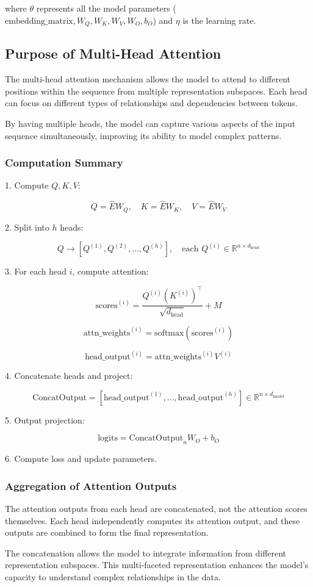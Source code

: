 \documentclass{article}
\begin{document}
where \( \theta \) represents all the model parameters (\( \text{embedding\_matrix}, W_Q, W_K, W_V, W_O, b_O \)) and \( \eta \) is the learning rate.

\subsection{Purpose of Multi-Head Attention}

The multi-head attention mechanism allows the model to attend to different positions within the sequence from multiple representation subspaces. Each head can focus on different types of relationships and dependencies between tokens.

By having multiple heads, the model can capture various aspects of the input sequence simultaneously, improving its ability to model complex patterns.

\subsubsection{Computation Summary}

1. Compute \( Q, K, V \):

   \[
   Q = \hat{E} W_Q, \quad K = \hat{E} W_K, \quad V = \hat{E} W_V
   \]

2. Split into \( h \) heads:

   \[
   Q \rightarrow [Q^{(1)}, Q^{(2)}, \dots, Q^{(h)}], \quad \text{each } Q^{(i)} \in \mathbb{R}^{n \times d_{\text{head}}}
   \]

3. For each head \( i \), compute attention:

   \[
   \text{scores}^{(i)} = \frac{Q^{(i)} (K^{(i)})^\top}{\sqrt{d_{\text{head}}}} + M
   \]
   
   \[
   \text{attn\_weights}^{(i)} = \text{softmax}(\text{scores}^{(i)})
   \]
   
   \[
   \text{head\_output}^{(i)} = \text{attn\_weights}^{(i)} V^{(i)}
   \]

4. Concatenate heads and project:

   \[
   \text{ConcatOutput} = [\text{head\_output}^{(1)}, \dots, \text{head\_output}^{(h)}] \in \mathbb{R}^{n \times d_{\text{model}}}
   \]

5. Output projection:

   \[
   \text{logits} = \text{ConcatOutput}_{n} W_O + b_O
   \]

6. Compute loss and update parameters.

\subsubsection{Aggregation of Attention Outputs}

The attention outputs from each head are concatenated, not the attention scores themselves. Each head independently computes its attention output, and these outputs are combined to form the final representation.

The concatenation allows the model to integrate information from different representation subspaces. This multi-faceted representation enhances the model's capacity to understand complex relationships in the data.
\end{document}
